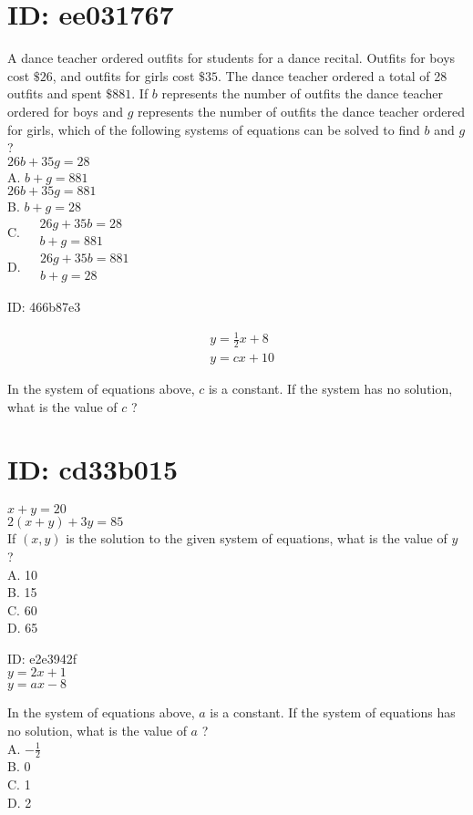 \section*{ID: ee031767}
A dance teacher ordered outfits for students for a dance recital. Outfits for boys cost $\$ 26$, and outfits for girls cost $\$ 35$. The dance teacher ordered a total of 28 outfits and spent $\$ 881$. If $b$ represents the number of outfits the dance teacher ordered for boys and $g$ represents the number of outfits the dance teacher ordered for girls, which of the following systems of equations can be solved to find $b$ and $g$ ?\\
$26 b+35 g=28$\\
A. $b+g=881$\\
$26 b+35 g=881$\\
B. $b+g=28$\\
C. $\begin{aligned} & 26 g+35 b=28 \\ & b+g=881\end{aligned}$\\
D. $\begin{aligned} & 26 g+35 b=881 \\ & b+g=28\end{aligned}$

ID: 466b87e3

$$
\begin{aligned}
& y=\frac{1}{2} x+8 \\
& y=c x+10
\end{aligned}
$$

In the system of equations above, $c$ is a constant. If the system has no solution, what is the value of $c$ ?

\section*{ID: cd33b015}
$x+y=20$\\
$2(x+y)+3 y=85$\\
If $(x, y)$ is the solution to the given system of equations, what is the value of $y$ ?\\
A. 10\\
B. 15\\
C. 60\\
D. 65

ID: e2e3942f\\
$y=2 x+1$\\
$y=a x-8$

In the system of equations above, $a$ is a constant. If the system of equations has no solution, what is the value of $a$ ?\\
A. $-\frac{1}{2}$\\
B. 0\\
C. 1\\
D. 2


